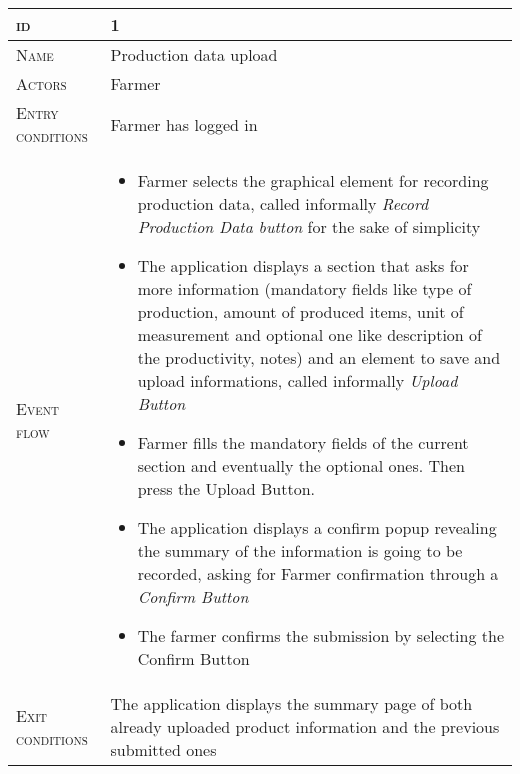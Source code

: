 \begin{table}[H]
    \centering
    \begin{tabular}[c]{|l|p{}|}
        \hline %
    	\textsc{id}                 &   1\\
    	\hline %
    	\textsc{Name}               &   Production data upload\\
    	\hline %
    	\textsc{Actors}             &   Farmer\\
    	\hline %
    	\textsc{Entry conditions}   &   Farmer has logged in\\
    	\hline %
    	\textsc{Event flow}         &   \footnotesize
            	                        \begin{itemize}
                                    	    \item Farmer selects the graphical element for recording production data, called informally \textit{Record Production Data button} for the sake of simplicity
                                    		\item The application displays a section that asks for more information (mandatory fields like type of production, amount of produced items, unit of measurement and optional one like description of the productivity, notes) and an element to save and upload informations, called informally \textit{Upload Button}
                                    		\item Farmer fills the mandatory fields of the current section and eventually the optional ones. Then press the Upload Button.
                                    		\item The application displays a confirm popup revealing the summary of the information is going to be recorded, asking for Farmer confirmation through a \textit{Confirm Button}
                                    		\item The farmer confirms the submission by selecting the Confirm Button
                                        \end{itemize}\\
        \hline %
        \textsc{Exit conditions}    &  The application displays the summary page of both already uploaded product information and the previous submitted ones\\

\end{tabular}
\end{table}
